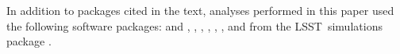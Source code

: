 \documentclass[\docopts]{\docclass}
\newcommand{\proj}[1]{\textsc{#1}}
\newcommand{\lsst}{\proj{LSST}}
\begin{document}
In addition to packages cited in the text, analyses performed in this paper used the following software packages:  and  \citep{numpyscipy},  \citep{matplotlib},  \citep{seaborn},  \citep{minfunc},  \citep{Malz:qp, Malz:2018},  \citep{pyskynet}, and  from the \lsst\ simulations package \citep{lsstphotutils}.





\end{document}

